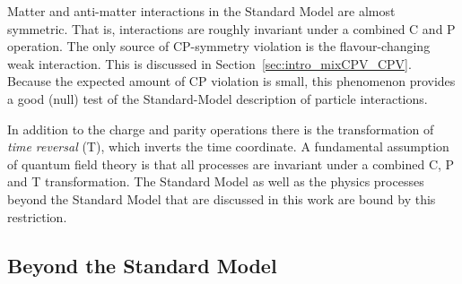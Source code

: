 Matter and anti-matter interactions in the Standard Model are almost symmetric. That is, interactions are roughly invariant under a
combined C and P operation. The only source of CP-symmetry violation is the flavour-changing weak interaction. This is discussed in
Section~\ref{sec:intro_mixCPV_CPV}. Because the expected amount of CP violation is small, this phenomenon provides a good (null) test of
the Standard-Model description of particle interactions.

In addition to the charge and parity operations there is the transformation of \emph{time reversal} (T), which inverts the time coordinate.
A fundamental assumption of quantum field theory is that all processes are invariant under a combined C, P and T transformation. The
Standard Model as well as the physics processes beyond the Standard Model that are discussed in this work are bound by this restriction.


\subsection{Beyond the Standard Model}

